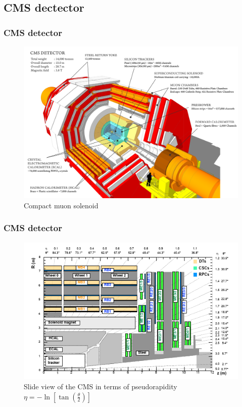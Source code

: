 \documentclass[11pt]{beamer}
\begin{document}
\begin{frame}
\subsection{CMS dectector}
\frametitle{CMS detector}
\begin{center}
	\begin{figure}
		\includegraphics[scale=0.08]{figures/cms.png}
		\caption*{Compact muon solenoid}
	\end{figure}
\end{center}
\end{frame}


\begin{frame}
\frametitle{CMS detector}
\begin{figure}[ht!]
	\centering
	\includegraphics[scale=0.6]{figures/csc.png}
	\caption*{Slide view of the CMS in terms of pseudorapidity $\eta=-\ln\left[\tan\left(\frac{\theta}{2}\right)\right]$}
\end{figure}
\end{frame}
\end{document}
